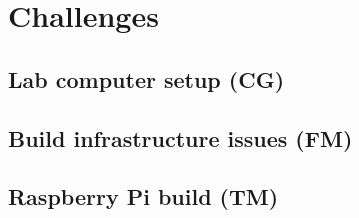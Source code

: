 \section{Challenges}
\label{sec:challenges}


\subsection{Lab computer setup (CG)}


\subsection{Build infrastructure issues (FM)}


\subsection{Raspberry Pi build (TM)}
\label{sec:pi-problems}

